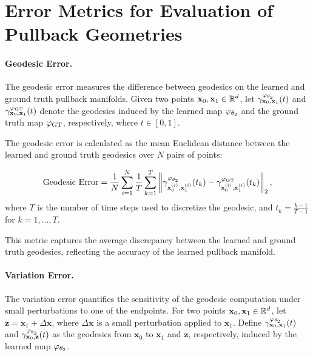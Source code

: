 \section{Error Metrics for Evaluation of Pullback Geometries}
\label{app:Error metrics for evaluation of Pullback Geometries}

\paragraph{Geodesic Error.}
The geodesic error measures the difference between geodesics on the learned and ground truth pullback manifolds. Given two points \(\mathbf{x}_0, \mathbf{x}_1 \in \mathbb{R}^{d}\), let \(\gamma_{\mathbf{x}_0, \mathbf{x}_1}^{\varphi_{\theta_2}}(t)\) and \(\gamma_{\mathbf{x}_0, \mathbf{x}_1}^{\varphi_{\mathrm{GT}}}(t)\) denote the geodesics induced by the learned map \(\varphi_{\theta_2}\) and the ground truth map \(\varphi_{\mathrm{GT}}\), respectively, where \(t \in [0, 1]\).

The geodesic error is calculated as the mean Euclidean distance between the learned and ground truth geodesics over \(N\) pairs of points:

\[
\text{Geodesic Error} = \frac{1}{N} \sum_{i=1}^{N} \frac{1}{T} \sum_{k=1}^{T} \left\| \gamma_{\mathbf{x}_0^{(i)}, \mathbf{x}_1^{(i)}}^{\varphi_{\theta_2}}(t_k) - \gamma_{\mathbf{x}_0^{(i)}, \mathbf{x}_1^{(i)}}^{\varphi_{\mathrm{GT}}}(t_k) \right\|_2,
\]
where \(T\) is the number of time steps used to discretize the geodesic, and \(t_k = \frac{k-1}{T-1}\) for \(k = 1, \dots, T\).

This metric captures the average discrepancy between the learned and ground truth geodesics, reflecting the accuracy of the learned pullback manifold.

\paragraph{Variation Error.}
The variation error quantifies the sensitivity of the geodesic computation under small perturbations to one of the endpoints. For two points \(\mathbf{x}_0, \mathbf{x}_1 \in \mathbb{R}^{d}\), let \(\mathbf{z} = \mathbf{x}_1 + \Delta\mathbf{x}\), where \(\Delta\mathbf{x}\) is a small perturbation applied to \(\mathbf{x}_1\). Define \(\gamma_{\mathbf{x}_0, \mathbf{x}_1}^{\varphi_{\theta_2}}(t)\) and \(\gamma_{\mathbf{x}_0, \mathbf{z}}^{\varphi_{\theta_2}}(t)\) as the geodesics from \(\mathbf{x}_0\) to \(\mathbf{x}_1\) and \(\mathbf{z}\), respectively, induced by the learned map \(\varphi_{\theta_2}\).

